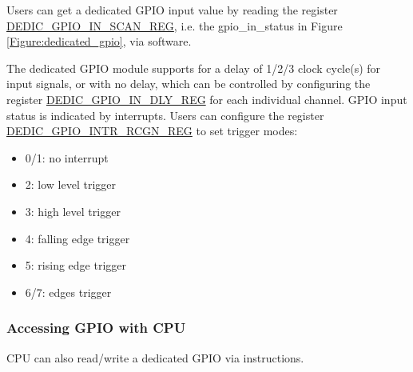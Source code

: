 \documentclass[main\_\_EN.tex]{subfiles}
\begin{document}
Users can get a dedicated GPIO input value by reading the register \hyperref[regdesc:DEDICGPIOINSCANREG]{DEDIC\_GPIO\_IN\_SCAN\_REG}, i.e. the gpio\_in\_status in Figure \ref{Figure:dedicated_gpio}, via software.

The dedicated GPIO module supports for a delay of 1/2/3 clock cycle(s) for input signals, or with no delay, which can be controlled by configuring the register \hyperref[regdesc:DEDICGPIOINDLYREG]{DEDIC\_GPIO\_IN\_DLY\_REG} for each individual channel. GPIO input status is indicated by interrupts. Users can configure the register \hyperref[regdesc:DEDICGPIOINTRRCGNREG]{DEDIC\_GPIO\_INTR\_RCGN\_REG} to set trigger modes:
\begin{itemize}
    \item 0/1: no interrupt
    \item 2: low level trigger
    \item 3: high level trigger
    \item 4: falling edge trigger
    \item 5: rising edge trigger
    \item 6/7: edges trigger
\end{itemize}

\subsubsection{Accessing GPIO with CPU}\label{cpu_instructor}

CPU can also read/write a dedicated GPIO via instructions.
\end{document}
